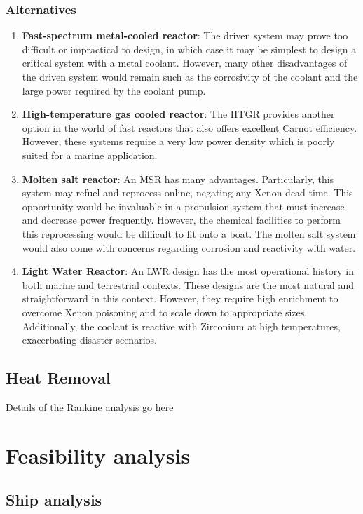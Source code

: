 \documentclass[12pt]{article}
\begin{document}
\subsubsection{Alternatives}
\begin{enumerate}
    \item \textbf{Fast-spectrum metal-cooled reactor}: The driven system may prove too difficult or impractical to design, in which case it may be simplest to design a critical system with a metal coolant. However, many other disadvantages of the driven system would remain such as the corrosivity of the coolant and the large power required by the coolant pump.
    \item \textbf{High-temperature gas cooled reactor}: The HTGR provides another option in the world of fast reactors that also offers excellent Carnot efficiency. However, these systems require a very low power density which is poorly suited for a marine application.
    \item \textbf{Molten salt reactor}: An MSR has many advantages. Particularly, this system may refuel and reprocess online, negating any Xenon dead-time. This opportunity would be invaluable in a propulsion system that must increase and decrease power frequently. However, the chemical facilities to perform this reprocessing would be difficult to fit onto a boat. The molten salt system would also come with concerns regarding corrosion and reactivity with water.
    \item \textbf{Light Water Reactor}: An LWR design has the most operational history in both marine and terrestrial contexts. These designs are the most natural and straightforward in this context. However, they require high enrichment to overcome Xenon poisoning and to scale down to appropriate sizes. Additionally, the coolant is reactive with Zirconium at high temperatures, exacerbating disaster scenarios.
\end{enumerate}

\subsection{Heat Removal}
Details of the Rankine analysis go here

\section{Feasibility analysis}
\subsection{Ship analysis}
\end{document}
